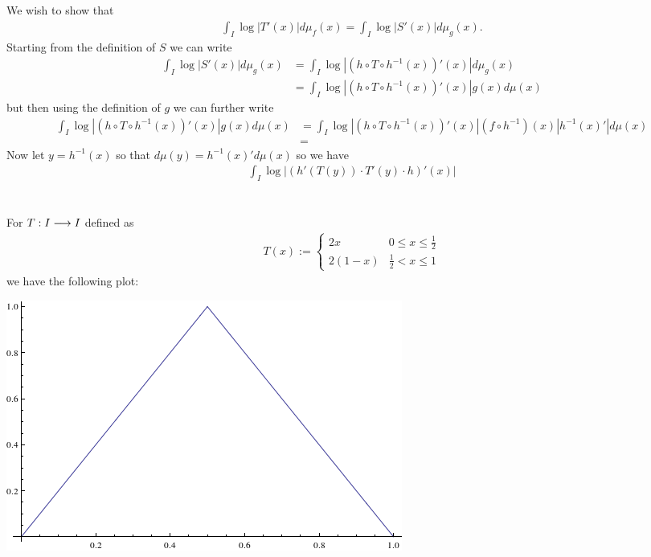 \documentclass{unswmaths}
\begin{document}
\subsection{}
We wish to show that 
\begin{align}
  \int_I \log|T'(x)|d\mu_f(x) = \int_I \log|S'(x)|d\mu_g(x).
\end{align}
Starting from the definition of $ S $ we can write
\begin{align}
  \int_I \log|S'(x)|d\mu_g(x) &= \int_I \log|\left( h \circ T \circ h^{-1}(x) \right)'(x)|d\mu_g(x) \\
    &= \int_I \log|\left( h \circ T \circ h^{-1}(x) \right)'(x)|g(x)d\mu(x)
\end{align}
but then using the definition of $ g $ we can further write
\begin{align}
  \int_I \log|\left( h \circ T \circ h^{-1}(x) \right)'(x)|g(x)d\mu(x) &= \int_I \log|\left( h \circ T \circ h^{-1}(x) \right)'(x)|(f\circ h^{-1})(x) |h^{-1}(x)'|d\mu(x) \\
  &= 
\end{align}
Now let $ y = h^{-1}(x) $ so that $ d\mu(y) = h^{-1}(x)' d\mu(x) $ so we have
\begin{align}
  \int_{I} \log| \left( h'(T(y))\cdot T'(y) \cdot h \right)'(x) |
\end{align}

\section{}
\subsection{}
For $ T : I \longrightarrow I $ defined as
\begin{align}
  T(x) := 
  \begin{cases}
    2x  & 0 \leq x \leq \frac{1}{2} \\
    2(1-x) & \frac{1}{2} < x \leq 1
  \end{cases}
\end{align}
we have the following plot:


\includegraphics[scale=0.5]{qn_4_plot}
\end{document}
